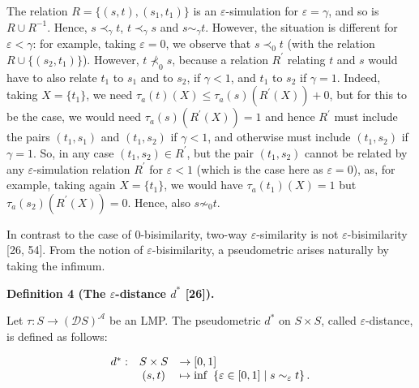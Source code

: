  
 
The relation $R=\{(s,t),(s_{1},t_{1})\}$ is an $\varepsilon$-simulation for $\varepsilon=\gamma$, and so is $R\cup R^{-1}$. Hence, $s\prec_{{\gamma}}t$, $t\prec_{{\gamma}}s$ and $s\sim_{{\gamma}}t$. However, the situation is different for $\varepsilon<\gamma$: for example, taking $\varepsilon=0$, we observe that $s\prec_{0}t$ (with the relation $R\cup\{(s_{2},t_{1})\}$). However, $t\not\prec_{0}s$, because a relation $R^{\prime}$ relating $t$ and $s$ would have to also relate $t_{1}$ to $s_{1}$ and to $s_{2}$, if $\gamma<1$, and $t_{1}$ to $s_{2}$ if $\gamma=1$. Indeed, taking $X=\{t_{1}\}$, we need $\tau_{a}(t)(X)\leq\tau_{a}(s)(R^{\prime}(X))+0$, but for this to be the case, we would need $\tau_{a}(s)(R^{\prime}(X))=1$ and hence $R^{\prime}$ must include the pairs $(t_{1},s_{1})$ and $(t_{1},s_{2})$ if $\gamma<1$, and otherwise must include $(t_{1},s_{2})$ if $\gamma=1$. So, in any case $(t_{1},s_{2})\in R^{\prime}$, but the pair $(t_{1},s_{2})$ cannot be related by any $\varepsilon$-simulation relation $R^{\prime}$ for $\varepsilon<1$ (which is the case here as $\varepsilon=0$), as, for example, taking again $X=\{t_{1}\}$, we would have $\tau_{a}(t_{1})(X)=1$ but $\tau_{a}(s_{2})(R^{\prime}(X))=0$. Hence, also $s\not\sim_{0}t$.\par
 
 
 
 
In contrast to the case of 0-bisimilarity, two-way $\varepsilon$-similarity is not $\varepsilon$-bisimilarity [26, 54]. From the notion of $\varepsilon$-bisimilarity, a pseudometric arises naturally by taking the infimum.\par
 
 
 
\par\medskip\noindent\textbf{Definition 4 (The $\varepsilon$-distance $d^{*}$ [26]).}\par
 
 
Let $\tau:S\to(\mathcal{D}S)^{\mathcal{A}}$ be an LMP. The pseudometric $d^{*}$ on $S\times S$, called $\varepsilon$-distance, is defined as follows:\par
  
\par  \quad  \[\begin{array}[]{lcl}d^{*}:&S\times S&\rightarrow[0,1]\\
&(s,t)&\mapsto\inf\ \left\{\varepsilon\in[0,1]\mid s\sim_{\varepsilon}t\right\}.\end{array}\]\quad  \quad  
  
